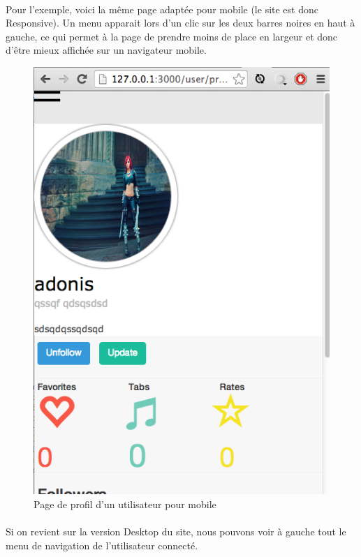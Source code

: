 \paragraph{}
Pour l'exemple, voici la même page adaptée pour mobile (le site est donc Responsive). Un menu apparait lors d'un clic sur les deux barres noires en haut à gauche, ce qui permet à la page de prendre moins de place en largeur et donc d'être mieux affichée sur un navigateur mobile.
\begin{figure}[H]
\centering
\includegraphics[scale=0.5]{Responsive1}
\caption{Page de profil d'un utilisateur pour mobile}
\end{figure}
\paragraph{}

\paragraph{}
Si on revient sur la version Desktop du site, nous pouvons voir à gauche tout le menu de navigation de l'utilisateur connecté.

